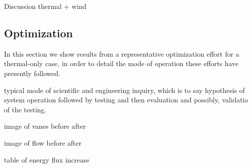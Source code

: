 Discussion thermal + wind

\subsection{Optimization}

In this section we show results from a representative optimization
effort for a thermal-only case, in order to detail the mode of operation
these efforts have presently followed. 

typical mode of scientific and engineering inquiry, which is to say
hypothesis of system operation followed by testing and then evaluation
and possibly, validatio of the testing. 

image of vanes before after

image of flow before after

table of energy flux increase